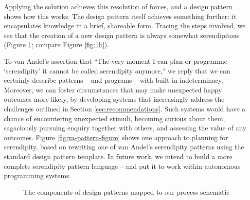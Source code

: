 %
%
Applying the solution achieves this resolution of forces, and a design
pattern shows how this works.  The design pattern itself achieves
something further: it encapsulates knowledge in a brief, shareable
form.  Tracing
the steps involved, we see that the creation of a new design pattern
is always somewhat serendipitous (Figure \ref{fig:pattern-schematic};
compare Figure \ref{fig:1b}).  

To van Andel's assertion that ``The very moment I can plan or
programme `serendipity' it cannot be called serendipity anymore,'' we
reply that we can certainly describe patterns -- and programs -- with
built-in indeterminacy.  Moreover, we can foster circumstances that
may make unexpected happy outcomes more likely, by developing systems
that increasingly address the challenges outlined in Section
\ref{sec:recommendations}.  Such systems would have a chance of encountering
unexpected stimuli, becoming curious about them, sagaciously pursuing enquiry
together with others, and assessing the value of any outcomes.  
%
Figure \ref{fig:va-pattern-figure} shows one approach to
planning for serendipity, based on rewriting one of van Andel's
serendipity patterns using the standard design pattern template.  In
future work, we intend to build a more complete serendipity pattern
language -- and put it to work within autonomous programming systems.


\begin{figure}

\caption{The components of design patterns mapped to our process schematic\label{fig:pattern-schematic}}
\end{figure}

